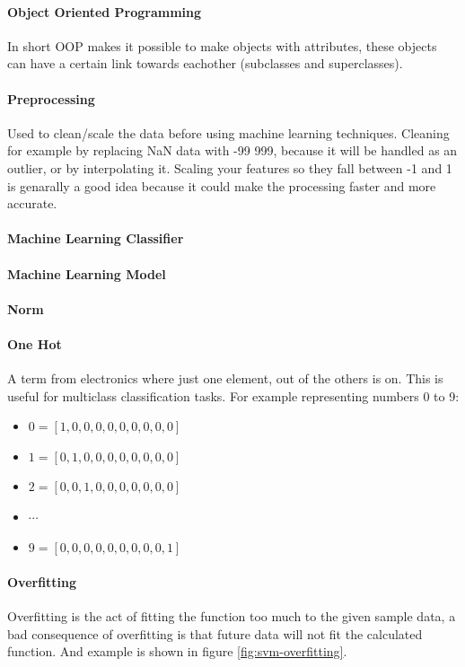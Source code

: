 \paragraph{Object Oriented Programming}
In short OOP makes it possible to make objects with attributes, these objects can have a certain link towards eachother (subclasses and superclasses).

\paragraph{Preprocessing} 
Used to clean/scale the data before using machine learning techniques. Cleaning for example by replacing NaN data with -99 999, because it will be handled as an outlier, or by interpolating it. Scaling your features so they fall between -1 and 1 is genarally a good idea because it could make the processing faster and more accurate.

\paragraph{Machine Learning Classifier} 

\paragraph{Machine Learning Model} 

\paragraph{Norm} 

\paragraph{One Hot}
A term from electronics where just one element, out of the others is on. This is useful for multiclass classification tasks. For example representing numbers 0 to 9: 
\begin{itemize}
\item $0 = [1, 0, 0, 0, 0, 0, 0, 0, 0, 0]$
\item $1 = [0, 1, 0, 0, 0, 0, 0, 0, 0, 0]$
\item $2 = [0, 0, 1, 0, 0, 0, 0, 0, 0, 0]$
\item[] $\cdots$
\item $9 = [0, 0, 0, 0, 0, 0, 0, 0, 0, 1]$

\end{itemize}
\paragraph{Overfitting}
Overfitting is the act of fitting the function too much to the given sample data, a bad consequence of overfitting is that future data will not fit the calculated function. And example is shown in figure \ref{fig:svm-overfitting}.

